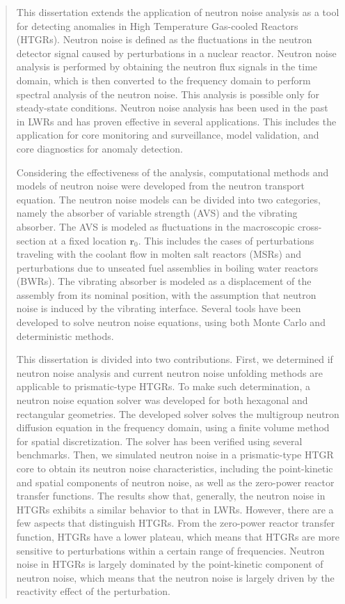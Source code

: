 \documentclass{uiucthesis2021}
\begin{document}
\begin{abstract}

This dissertation extends the application of neutron noise analysis as a tool for detecting anomalies in High Temperature Gas-cooled Reactors (HTGRs). Neutron noise is defined as the fluctuations in the neutron detector signal caused by perturbations in a nuclear reactor. Neutron noise analysis is performed by obtaining the neutron flux signals in the time domain, which is then converted to the frequency domain to perform spectral analysis of the neutron noise. This analysis is possible only for steady-state conditions. Neutron noise analysis has been used in the past in LWRs and has proven effective in several applications. This includes the application for core monitoring and surveillance, model validation, and core diagnostics for anomaly detection.

Considering the effectiveness of the analysis, computational methods and models of neutron noise were developed from the neutron transport equation. The neutron noise models can be divided into two categories, namely the absorber of variable strength (AVS) and the vibrating absorber. The AVS is modeled as fluctuations in the macroscopic cross-section at a fixed location $\textbf{r}_0$. This includes the cases of perturbations traveling with the coolant flow in molten salt reactors (MSRs) and perturbations due to unseated fuel assemblies in boiling water reactors (BWRs). The vibrating absorber is modeled as a displacement of the assembly from its nominal position, with the assumption that neutron noise is induced by the vibrating interface. Several tools have been developed to solve neutron noise equations, using both Monte Carlo and deterministic methods.

This dissertation is divided into two contributions. First, we determined if neutron noise analysis and current neutron noise unfolding methods are applicable to prismatic-type HTGRs. To make such determination, a neutron noise equation solver was developed for both hexagonal and rectangular geometries. The developed solver solves the multigroup neutron diffusion equation in the frequency domain, using a finite volume method for spatial discretization. The solver has been verified using several benchmarks. Then, we simulated neutron noise in a prismatic-type HTGR core to obtain its neutron noise characteristics, including the point-kinetic and spatial components of neutron noise, as well as the zero-power reactor transfer functions. The results show that, generally, the neutron noise in HTGRs exhibits a similar behavior to that in LWRs. However, there are a few aspects that distinguish HTGRs. From the zero-power reactor transfer function, HTGRs have a lower plateau, which means that HTGRs are more sensitive to perturbations within a certain range of frequencies. Neutron noise in HTGRs is largely dominated by the point-kinetic component of neutron noise, which means that the neutron noise is largely driven by the reactivity effect of the perturbation.


\end{abstract}
\end{document}
